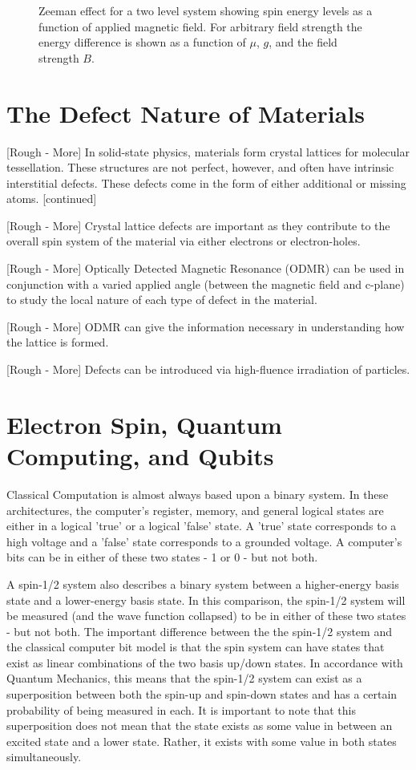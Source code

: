 \documentclass[oneside, astronomy, noacknowlegments]{BYUPhys}
\begin{document}
\begin{figure}
    \caption[Zeeman effect and resonant conditions in matter]{\label{fig:Zeeman}
     Zeeman effect for a two level system showing spin energy levels as a function of applied magnetic field. For arbitrary field strength the energy difference is shown as a function of $\mu$, $g$, and the field strength $B$.}
\end{figure}

\section{The Defect Nature of Materials}

[Rough - More] In solid-state physics, materials form crystal lattices for molecular tessellation. These structures are not perfect, however, and often have intrinsic interstitial defects. These defects come in the form of either additional or missing atoms. [continued]

[Rough - More] Crystal lattice defects are important as they contribute to the overall spin system of the material via either electrons or electron-holes.

[Rough - More] Optically Detected Magnetic Resonance (ODMR) can be used in conjunction with a varied applied angle (between the magnetic field and c-plane) to study the local nature of each type of defect in the material.

[Rough - More] ODMR can give the information necessary in understanding how the lattice is formed.

[Rough - More] Defects can be introduced via high-fluence irradiation of particles.

\section{Electron Spin, Quantum Computing, and Qubits}

Classical Computation is almost always based upon a binary system. In these architectures, the computer's register, memory, and general logical states are either in a logical 'true' or a logical 'false' state. A 'true' state corresponds to a high voltage and a 'false' state corresponds to a grounded voltage. A computer's bits can be in either of these two states - 1 or 0 - but not both.

A spin-1/2 system also describes a binary system between a higher-energy basis state and a lower-energy basis state. In this comparison, the spin-1/2 system will be measured (and the wave function collapsed) to be in either of these two states - but not both. The important difference between the the spin-1/2 system and the classical computer bit model is that the spin system can have states that exist as linear combinations of the two basis up/down states. In accordance with Quantum Mechanics, this means that the spin-1/2 system can exist as a superposition between both the spin-up and spin-down states and has a certain probability of being measured in each. It is important to note that this superposition does not mean that the state exists as some value in between an excited state and a lower state. Rather, it exists with some value in both states simultaneously.
\end{document}
